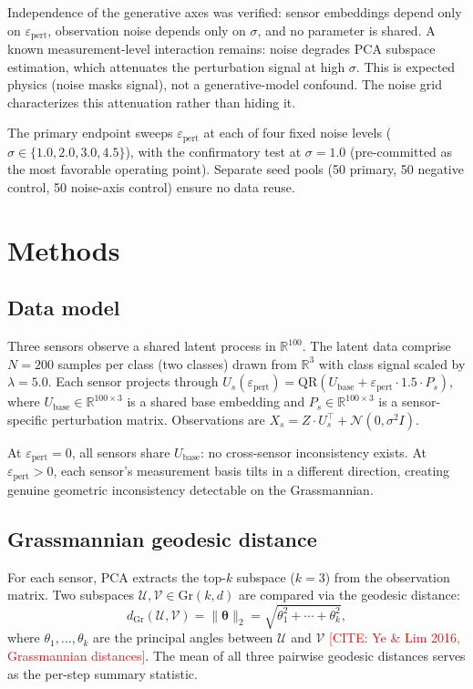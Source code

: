 \documentclass[11pt]{article}
\newcommand{\eps}{\varepsilon}
\newcommand{\epspert}{\eps_\mathrm{pert}}
\newcommand{\Gr}{\mathrm{Gr}}
\begin{document}
Independence of the generative axes was verified: sensor embeddings
depend only on $\epspert$, observation noise depends only on
$\sigma$, and no parameter is shared.  A known measurement-level
interaction remains: noise degrades PCA subspace estimation, which
attenuates the perturbation signal at high $\sigma$.  This is
expected physics (noise masks signal), not a generative-model
confound.  The noise grid characterizes this attenuation rather
than hiding it.

The primary endpoint sweeps $\epspert$ at each of four fixed noise
levels ($\sigma \in \{1.0, 2.0, 3.0, 4.5\}$), with the
confirmatory test at $\sigma = 1.0$ (pre-committed as the most
favorable operating point).  Separate seed pools (50 primary, 50
negative control, 50 noise-axis control) ensure no data reuse.

\section{Methods}
\label{sec:methods}

\subsection{Data model}

Three sensors observe a shared latent process in
$\mathbb{R}^{100}$.  The latent data comprise $N = 200$ samples
per class (two classes) drawn from $\mathbb{R}^3$ with class
signal scaled by $\lambda = 5.0$.  Each sensor projects through
$U_s(\epspert) = \mathrm{QR}(U_\mathrm{base} + \epspert \cdot 1.5
\cdot P_s)$, where $U_\mathrm{base} \in \mathbb{R}^{100 \times 3}$
is a shared base embedding and $P_s \in \mathbb{R}^{100 \times 3}$
is a sensor-specific perturbation matrix.  Observations are
$X_s = Z \cdot U_s^\top + \mathcal{N}(0, \sigma^2 I)$.

At $\epspert = 0$, all sensors share $U_\mathrm{base}$: no
cross-sensor inconsistency exists.  At $\epspert > 0$, each
sensor's measurement basis tilts in a different direction,
creating genuine geometric inconsistency detectable on the
Grassmannian.

\subsection{Grassmannian geodesic distance}

For each sensor, PCA extracts the top-$k$ subspace ($k = 3$) from
the observation matrix.  Two subspaces $\mathcal{U},
\mathcal{V} \in \Gr(k, d)$ are compared via the geodesic distance:
\[
  d_{\Gr}(\mathcal{U}, \mathcal{V}) =
    \|\boldsymbol{\theta}\|_2
    = \sqrt{\theta_1^2 + \cdots + \theta_k^2},
\]
where $\theta_1, \ldots, \theta_k$ are the principal angles between
$\mathcal{U}$ and $\mathcal{V}$
\textcolor{red}{[CITE: Ye \& Lim 2016, Grassmannian distances]}.
The mean of all three pairwise geodesic distances serves as the
per-step summary statistic.
\end{document}
